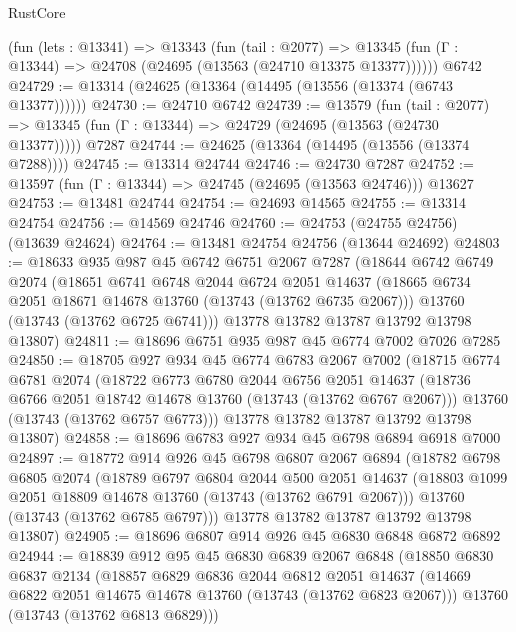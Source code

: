 \begin{lexlean}{RustCore}
\begin{coremodule}
    (fun (lets : @13341) =>
    @13343
      (fun (tail : @2077) =>
      @13345 (fun (Γ : @13344) => @24708 (@24695 (@13563 (@24710 @13375 @13377))))))
    @6742
@24729 := @13314 (@24625 (@13364 (@14495 (@13556 (@13374 (@6743 @13377))))))
@24730 := @24710 @6742
@24739 := @13579
    (fun (tail : @2077) => @13345 (fun (Γ : @13344) => @24729 (@24695 (@13563 (@24730 @13377)))))
    @7287
@24744 := @24625 (@13364 (@14495 (@13556 (@13374 @7288))))
@24745 := @13314 @24744
@24746 := @24730 @7287
@24752 := @13597 (fun (Γ : @13344) => @24745 (@24695 (@13563 @24746))) @13627
@24753 := @13481 @24744
@24754 := @24693 @14565
@24755 := @13314 @24754
@24756 := @14569 @24746
@24760 := @24753 (@24755 @24756) (@13639 @24624)
@24764 := @13481 @24754 @24756 (@13644 @24692)
@24803 := @18633
    @935
    @987
    @45
    @6742
    @6751
    @2067
    @7287
    (@18644
      @6742
      @6749
      @2074
      (@18651
        @6741
        @6748
        @2044
        @6724
        @2051
        @14637
        (@18665 @6734 @2051 @18671 @14678 @13760 (@13743 (@13762 @6735 @2067)))
        @13760
        (@13743 (@13762 @6725 @6741)))
      @13778
      @13782
      @13787
      @13792
      @13798
      @13807)
@24811 := @18696 @6751 @935 @987 @45 @6774 @7002 @7026 @7285
@24850 := @18705
    @927
    @934
    @45
    @6774
    @6783
    @2067
    @7002
    (@18715
      @6774
      @6781
      @2074
      (@18722
        @6773
        @6780
        @2044
        @6756
        @2051
        @14637
        (@18736 @6766 @2051 @18742 @14678 @13760 (@13743 (@13762 @6767 @2067)))
        @13760
        (@13743 (@13762 @6757 @6773)))
      @13778
      @13782
      @13787
      @13792
      @13798
      @13807)
@24858 := @18696 @6783 @927 @934 @45 @6798 @6894 @6918 @7000
@24897 := @18772
    @914
    @926
    @45
    @6798
    @6807
    @2067
    @6894
    (@18782
      @6798
      @6805
      @2074
      (@18789
        @6797
        @6804
        @2044
        @500
        @2051
        @14637
        (@18803 @1099 @2051 @18809 @14678 @13760 (@13743 (@13762 @6791 @2067)))
        @13760
        (@13743 (@13762 @6785 @6797)))
      @13778
      @13782
      @13787
      @13792
      @13798
      @13807)
@24905 := @18696 @6807 @914 @926 @45 @6830 @6848 @6872 @6892
@24944 := @18839
    @912
    @95
    @45
    @6830
    @6839
    @2067
    @6848
    (@18850
      @6830
      @6837
      @2134
      (@18857
        @6829
        @6836
        @2044
        @6812
        @2051
        @14637
        (@14669 @6822 @2051 @14675 @14678 @13760 (@13743 (@13762 @6823 @2067)))
        @13760
        (@13743 (@13762 @6813 @6829)))

\end{coremodule}
\end{lexlean}
